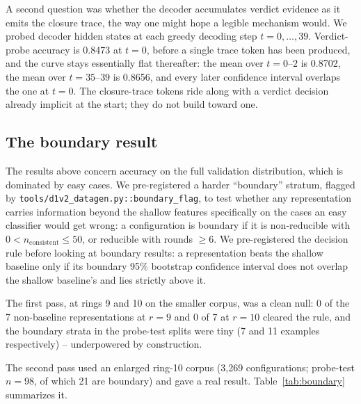A second question was whether the decoder accumulates verdict evidence as
it emits the closure trace, the way one might hope a legible mechanism
would. We probed decoder hidden states at each greedy decoding step
$t = 0, \dots, 39$. Verdict-probe accuracy is 0.8473 at $t=0$, before a
single trace token has been produced, and the curve stays essentially flat
thereafter: the mean over $t=0$--$2$ is 0.8702, the mean over $t=35$--$39$
is 0.8656, and every later confidence interval overlaps the one at $t=0$.
The closure-trace tokens ride along with a verdict decision already
implicit at the start; they do not build toward one.

\subsection{The boundary result}
\label{sec:ml-boundary}

The results above concern accuracy on the full validation distribution,
which is dominated by easy cases. We pre-registered a harder ``boundary''
stratum, flagged by \texttt{tools/d1v2\_datagen.py::boundary\_flag}, to test
whether any representation carries information beyond the shallow features
specifically on the cases an easy classifier would get wrong: a
configuration is boundary if it is non-reducible with
$0 < n_{\mathrm{consistent}} \le 50$, or reducible with rounds $\ge 6$. We
pre-registered the decision rule before looking at boundary results: a
representation beats the shallow baseline only if its boundary 95\%
bootstrap confidence interval does not overlap the shallow baseline's and
lies strictly above it.

The first pass, at rings 9 and 10 on the smaller corpus, was a clean null:
0 of the 7 non-baseline representations at $r=9$ and 0 of 7 at $r=10$ cleared the
rule, and
the boundary strata in the probe-test splits were tiny (7 and 11 examples
respectively) -- underpowered by construction.

The second pass used an enlarged ring-10 corpus (3{,}269 configurations;
probe-test $n=98$, of which 21 are boundary) and gave a real result.
Table~\ref{tab:boundary} summarizes it.

